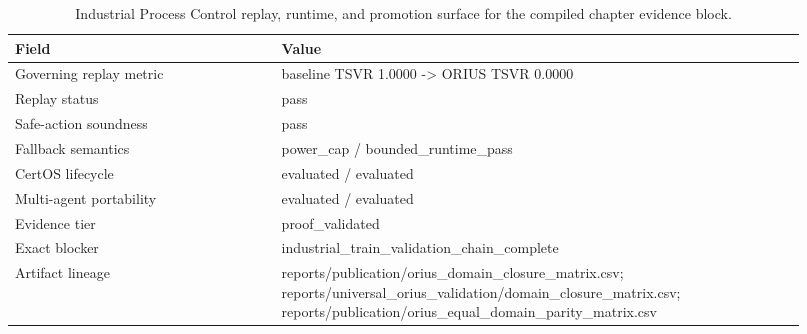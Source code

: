 \begin{table}[htbp]
\centering
\small
\caption{Industrial Process Control replay, runtime, and promotion surface for the compiled chapter evidence block.}
\label{tab:industrial-replay-surface}
\begin{tabular}{p{0.31\linewidth}p{0.61\linewidth}}
\toprule
\textbf{Field} & \textbf{Value}\\
\midrule
Governing replay metric & baseline TSVR 1.0000 -> ORIUS TSVR 0.0000\\
Replay status & pass\\
Safe-action soundness & pass\\
Fallback semantics & power\_cap / bounded\_runtime\_pass\\
CertOS lifecycle & evaluated / evaluated\\
Multi-agent portability & evaluated / evaluated\\
Evidence tier & proof\_validated\\
Exact blocker & industrial\_train\_validation\_chain\_complete\\
Artifact lineage & reports/publication/orius\_domain\_closure\_matrix.csv; reports/universal\_orius\_validation/domain\_closure\_matrix.csv; reports/publication/orius\_equal\_domain\_parity\_matrix.csv\\
\bottomrule
\end{tabular}
\end{table}
